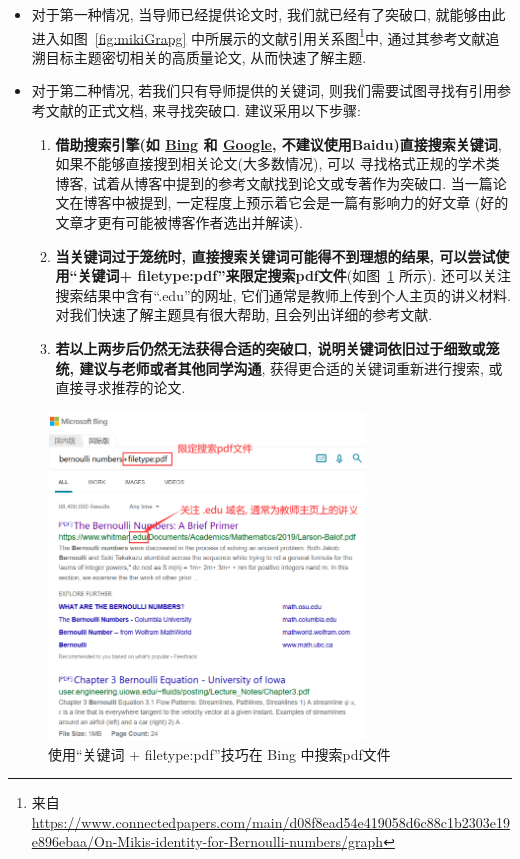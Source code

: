 \documentclass{formatBook}
\begin{document}
\begin{itemize}
    \item 对于第一种情况, 当导师已经提供论文时, 我们就已经有了突破口, 就能够由此进入如图~\ref{fig:mikiGrapg} 中所展示的文献引用关系图\footnote{来自\url{https://www.connectedpapers.com/main/d08f8ead54e419058d6c88c1b2303e19e896ebaa/On-Mikis-identity-for-Bernoulli-numbers/graph}}中, 通过其参考文献追溯目标主题密切相关的高质量论文, 从而快速了解主题.
    \item 对于第二种情况, 若我们只有导师提供的关键词, 则我们需要试图寻找有引用参考文献的正式文档, 来寻找突破口. 建议采用以下步骤:
          \begin{enumerate}
              \item \textbf{借助搜索引擎(如 \href{https://www.bing.com/}{Bing} 和 \href{https://www.google.com/}{Google}, 不建议使用Baidu)直接搜索关键词}, 如果不能够直接搜到相关论文(大多数情况), 可以 寻找格式正规的学术类博客, 试着从博客中提到的参考文献找到论文或专著作为突破口. 当一篇论文在博客中被提到, 一定程度上预示着它会是一篇有影响力的好文章 (好的文章才更有可能被博客作者选出并解读).
              \item \textbf{当关键词过于笼统时, 直接搜索关键词可能得不到理想的结果, 可以尝试使用``关键词+ filetype:pdf''来限定搜索pdf文件}(如图~\ref{fig:bing} 所示). 还可以关注搜索结果中含有``.edu''的网址, 它们通常是教师上传到个人主页的讲义材料.  对我们快速了解主题具有很大帮助, 且会列出详细的参考文献.
              \item \textbf{若以上两步后仍然无法获得合适的突破口, 说明关键词依旧过于细致或笼统, 建议与老师或者其他同学沟通}, 获得更合适的关键词重新进行搜索, 或直接寻求推荐的论文.
          \end{enumerate}
\end{itemize}

\begin{figure}[H]
    \centering
    \includegraphics[width=0.75\textwidth]{figure/bingSearch.png}
    \caption{使用``关键词 + filetype:pdf''技巧在 Bing 中搜索pdf文件}
    \label{fig:bing}
\end{figure}
\end{document}
